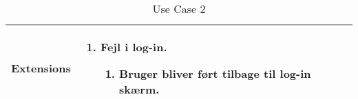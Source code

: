 \begin{table}[H]
\begin{tabular}{|l|p{10cm}|}
Extensions							& 

									\renewcommand{\labelenumi}{\Roman{enumi}:}
									\renewcommand{\labelenumii}{\alph{enumii})}
									\begin{enumerate}[topsep=0.0cm,leftmargin=0.5cm]
										\item Fejl i log-in.
											\begin{enumerate}[topsep=0cm, leftmargin=1cm]
												\item Bruger bliver ført tilbage til log-in skærm.
											\end{enumerate}
									\end{enumerate} \\\hline	

\end{tabular}
\caption{Use Case 2}
\label{tab:UC2}
\end{table}